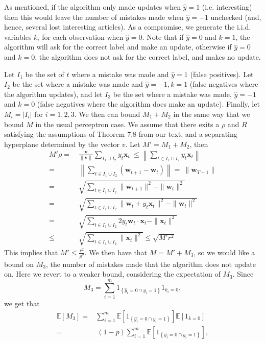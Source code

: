 \documentclass[12pt]{article}
\newcommand{\V}[1]{\boldsymbol{#1}}
\newcommand{\E}[0]{\mathbb{E}}
\begin{document}
As mentioned, if the algorithm only made updates when $\widehat{y}=1$ (i.e. interesting) then this would leave the number of mistakes made when $\widehat{y} = -1$ unchecked (and, hence, several lost interesting articles). As a compromise, we generate the i.i.d. variables $k_i$ for each observation when $\widehat{y} = 0$. Note that if $\hat{y} = 0$ and $k=1$, the algorithm will ask for the correct label and make an update, otherwise if $\hat{y} = 0$ and $k=0$, the algorithm does not ask for the correct label, and makes no update.


Let $I_1$ be the set of $t$ where a mistake was made and
$\hat{y}=1$ (false positives).  Let $I_2$ be the set where a mistake was made and
$\hat{y} = -1, k = 1$ (false negatives where the algorithm updates), and let $I_3$ be the set where a mistake was
made, $\hat{y} = -1$ and $k = 0$ (false negatives where the algorithm does  make an update). Finally, let $M_i = |I_i|$ for $i =
1,2,3$. We then can bound $M_1 + M_2$ in the same way that we bound
$M$ in the usual perceptron case.  We assume that there exits a $\rho$
and $R$ satisfying the assumptions of Theorem 7.8 from our text, and a separating hyperplane determined by the vector $v$. Let $M' = M_1 + M_2$, then
\begin{align*}
M' \rho =&\ \frac{\V{v}}{\|\V{v}\|}\sum_{I_1 \cup I_2} y_t\V{x}_t \
 \leq   \left\|\sum_{t \in I_1 \cup I_2} y_t \V{x}_t\right\| \\
=& \ \left\|\sum_{t \in I_1 \cup I_2} (\V{w}_{t+1} - \V{w}_t) \right\| 
= \ \|\V{w}_{T+1} \| \\
=&\ \sqrt{\sum_{t \in I_1 \cup I_2} \|  \V{w}_{t+1}\|^2 - \|\V{w}_t\|^2 }\\
= &\ \sqrt{\sum_{t \in I_1 \cup I_2} \|  \V{w}_{t} + y_t\V{x}_t\|^2 -
  \|\V{w}_t\|^2 }\\
= &\ \sqrt{\sum_{t \in I_1 \cup I_2} 2y_t\V{w}_t\cdot \V{x}_t -
  \|\V{x}_t\|^2} \\
\leq &\ \sqrt{\sum_{t \in I_1 \cup I_2} \|\V{x}_t\|^2} \leq
\sqrt{M'r^2} \end{align*}
This implies that $M' \leq \frac{r^2}{\rho^2}$.
We then have that $M = M' + M_3$, so we would like a bound on $M_3$, the number of mistakes made that the algorithm does not update on.
Here we revert to a weaker bound, considering the expectation of
$M_3$. Since 
\[M_3 = \sum_{i=1}^m 1_{\left\{\hat{y}_i = 0 \cap y_i = 1\right\}}1_{k_i = 0}, \]
we get that
\begin{align*}
\E[M_3] = & \sum_{i=1}^m \E[1_{\left\{\hat{y_i} = 0 \cap y_i = 1\right\}}]\E[1_{k = 0}] \\
 = &\ (1 - p)\sum_{i=1}^m \E[1_{\left\{\hat{y_i} = 0 \cap y_i = 1\right\}}],
\end{align*}
\end{document}
